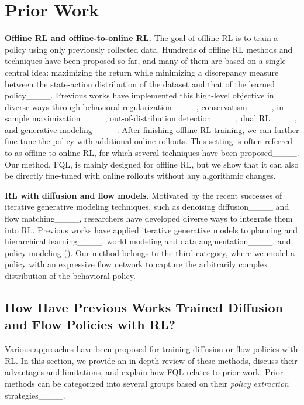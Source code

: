 \section{Prior Work}
\label{sec:related}

\textbf{Offline RL and offline-to-online RL.}
%
The goal of offline RL is to train a policy using only previously collected data.
Hundreds of offline RL methods and techniques have been proposed so far,
and many of them are based on a single central idea:
maximizing the return while minimizing a discrepancy measure between
the state-action distribution of the dataset and that of the learned policy____.
Previous works have implemented this high-level objective in diverse ways through
behavioral regularization____,
conservatism____,
in-sample maximization____,
out-of-distribution detection____,
dual RL____,
and generative modeling____.
After finishing offline RL training, we can further fine-tune the policy with additional online rollouts.
This setting is often referred to as offline-to-online RL,
for which several techniques have been proposed____.
Our method, FQL, is mainly designed for offline RL,
but we show that it can also be directly fine-tuned with online rollouts without any algorithmic changes.
%
%
%

\textbf{RL with diffusion and flow models.}
Motivated by the recent successes of iterative generative modeling techniques,
such as denoising diffusion____
and flow matching____,
researchers have developed diverse ways to integrate them into RL.
Previous works have applied iterative generative models to
planning and hierarchical learning____,
world modeling and data augmentation____,
and policy modeling ().
Our method belongs to the third category,
where we model a policy with an expressive flow network
to capture the arbitrarily complex distribution of the behavioral policy.
%
%
%
%
%
%
%
%
%
%
%
%

\subsection{How Have Previous Works Trained Diffusion and Flow Policies with RL?}
\label{sec:prev_solutions}

%


%
%
%
%
%

Various approaches have been proposed for training diffusion or flow policies with RL.
In this section, we provide an in-depth review of these methods, discuss their advantages and limitations,
and explain how FQL relates to prior work.
Prior methods can be categorized into several groups based on their \emph{policy extraction} strategies____.

